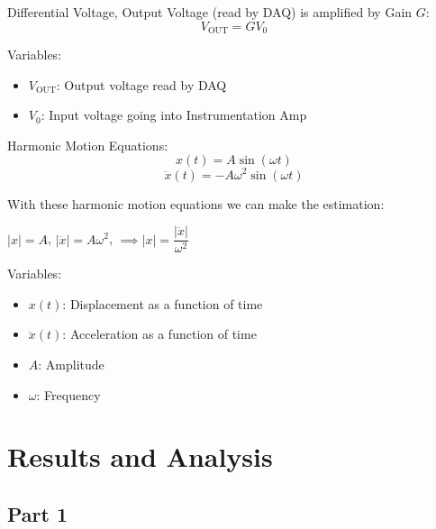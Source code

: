 \documentclass{article}
\begin{document}
Differential Voltage, Output Voltage (read by DAQ) is amplified by Gain $G$:
\begin{equation}
    V_{\text{OUT}} = GV_{0}
\end{equation}

Variables:
\begin{itemize}
    \item \(V_{\text{OUT}}\): Output voltage read by DAQ
    \item \(V_{0}\): Input voltage going into Instrumentation Amp
\end{itemize}
\vspace{5mm}

Harmonic Motion Equations:
\begin{equation}
    x(t) = A\sin{(\omega t)}
\end{equation}
\begin{equation}
    \ddot{x}(t) = -A\omega^{2} \sin{(\omega t)}
\end{equation}

With these harmonic motion equations we can make the estimation:
\begin{center}
    \(|x| = A\), \hspace{10mm} \(|\ddot{x}| = A\omega^{2}\), \hspace{10mm} \(\implies |x| = \dfrac{|\ddot{x}|}{\omega^{2}}\)
\end{center}

Variables:
\begin{itemize}
    \item \(x(t)\): Displacement as a function of time
    \item \(\ddot{x}(t)\): Acceleration as a function of time
    \item \(A\): Amplitude
    \item \(\omega\): Frequency
\end{itemize}
\vspace{5mm}

    
\section{Results and Analysis}
\subsection{Part 1} 
\end{document}

